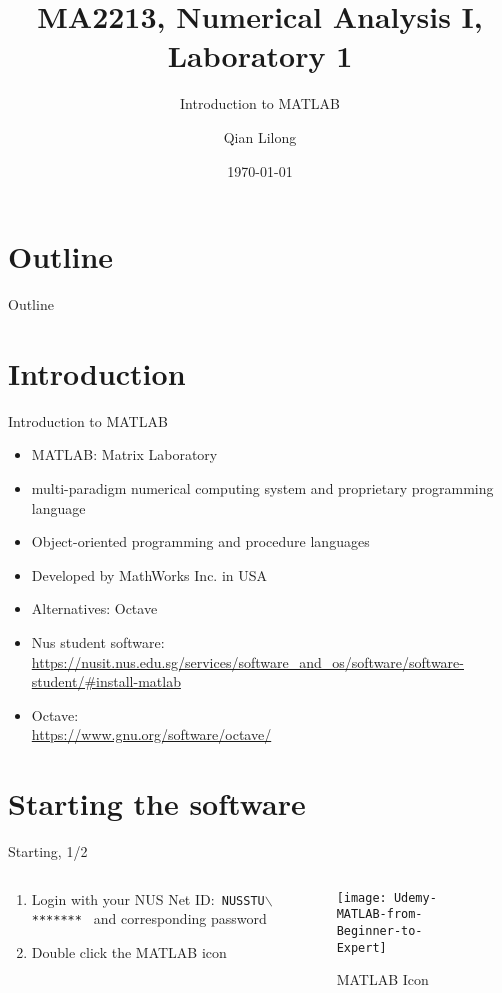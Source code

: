 \documentclass[aspectratio=169]{beamer}
\title{MA2213, Numerical Analysis I, Laboratory 1}
\subtitle{Introduction to MATLAB }
\author{Qian Lilong}
\institute{Department of Mathematics\\National University of Singapore}
\date{\today}
\begin{document}
\maketitle

\section*{Outline}
\begin{frame}{Outline}
	\tableofcontents
\end{frame}
%

\section{Introduction}
\begin{frame}{Introduction to MATLAB}
  \begin{itemize}
     \item MATLAB: Matrix Laboratory
    \item multi-paradigm numerical computing system and proprietary programming language 
    \item Object-oriented programming and procedure languages
    \item Developed by MathWorks Inc. in USA
    \item Alternatives: Octave
    \item Nus student software:  \\  {\tiny\rm
          \url{https://nusit.nus.edu.sg/services/software_and_os/software/software-student/\#install-matlab}}
    \item 
  Octave:\\{\tiny \url{https://www.gnu.org/software/octave/}}
  \end{itemize}
  \bigskip
\end{frame}
%

\section{Starting the software}
\begin{frame}{Starting, 1/2}
  \begin{columns}
  \begin{column}{0.475\textwidth}
    \begin{enumerate}
    	\item Login with your NUS Net ID:{\tt\color{blue} NUSSTU$\backslash$******* } and corresponding password
    	\item Double click the MATLAB icon 
    \end{enumerate}
  \end{column}
  \begin{column}{0.475\textwidth}
  \begin{figure}
  	\centering
  	\texttt{[image: Udemy-MATLAB-from-Beginner-to-Expert]}
  	\caption{MATLAB Icon}
  	\label{fig:udemy-matlab-from-beginner-to-expert}
  \end{figure}
  \end{column}
  \end{columns}
\end{frame}
\end{document}
